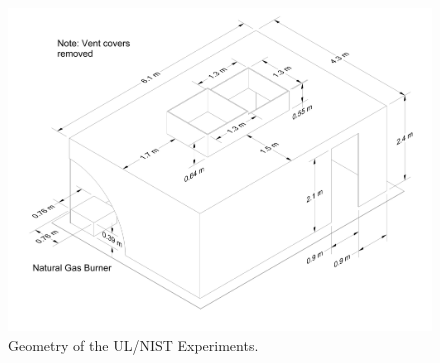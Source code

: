 \begin{figure}
\begin{center}
\includegraphics[width=6.5in]{FIGURES/UL_NIST_Vents/UL_NIST_Vents_Drawing}
\end{center}
\caption{Geometry of the UL/NIST Experiments.}
\label{UL_NIST_Drawing}
\end{figure}



